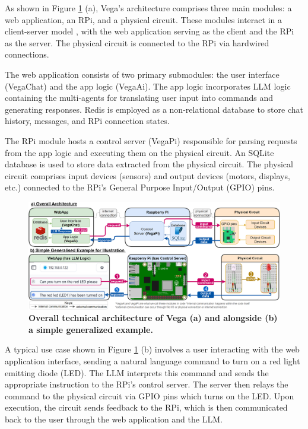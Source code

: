 \documentclass[lettersize,journal]{IEEEtran}
\begin{document}
As shown in Figure \ref{fig1} (a), Vega's architecture comprises three main modules: a web application, an RPi, and a physical circuit. These modules interact in a client-server model \cite{tanenbaum2002distributed}, with the web application serving as the client and the RPi as the server. The physical circuit is connected to the RPi via hardwired connections.

The web application consists of two primary submodules: the user interface (VegaChat) and the app logic (VegaAi). The app logic incorporates LLM logic containing the multi-agents for translating user input into commands and generating responses. Redis \cite{6106531} is employed as a non-relational database to store chat history, messages, and RPi connection states.

The RPi module hosts a control server (VegaPi) responsible for parsing requests from the app logic and executing them on the physical circuit. An SQLite database \cite{sqlite} is used to store data extracted from the physical circuit. The physical circuit comprises input devices (sensors) and output devices (motors, displays, etc.) connected to the RPi's General Purpose Input/Output (GPIO) pins.

\begin{figure}[!h]
  \centering
  \includegraphics[width=\textwidth]{images/fig1.png}
  \caption{\centering \textbf{Overall technical architecture of Vega (a) and alongside (b) a simple generalized example.}}
  \label{fig1}
  \end{figure}

A typical use case shown in Figure  \ref{fig1} (b) involves a user interacting with the web application interface, sending a natural language command to turn on a red light emitting diode (LED). The LLM interprets this command and sends the appropriate instruction to the RPi's control server. The server then relays the command to the physical circuit via GPIO pins which turns on the LED. Upon execution, the circuit sends feedback to the RPi, which is then communicated back to the user through the web application and the LLM.
\end{document}
